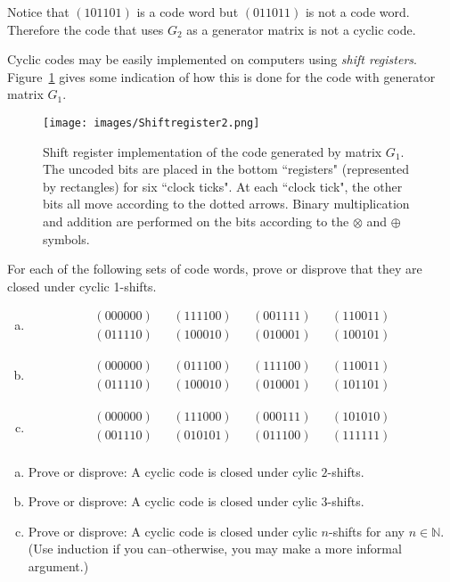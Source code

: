Notice that $(101101)$ is a code word but $(011011)$ is not a code word.  Therefore the code that uses $G_2$ as a generator matrix is not a cyclic code.

Cyclic codes may be easily implemented on computers using \emph{shift registers}. Figure~\ref{fig:shift} gives some indication of how this is done for the code with generator matrix $G_1$.
\begin{figure}[h]
\begin{center}
\texttt{[image: images/Shiftregister2.png]}
\end{center}
\caption{\label{fig:shift}Shift register implementation of the code generated by matrix $G_1$. The uncoded bits are placed in the bottom ``registers" (represented by rectangles) for six ``clock ticks". At each ``clock tick", the other bits all move according to the dotted arrows. Binary multiplication and addition are performed on the bits according to the $\otimes$ and $\oplus$ symbols. }
\end{figure}

\begin{exercise}\label{exercise:polycodes:proofofcyclic}
For each of the following sets of code words, prove or disprove that they are closed under cyclic 1-shifts.  
\begin{enumerate}[(a)]
\item
\[\begin{array}{ccccccc}
(000000) & & (111100) & & (001111) & & (110011)\\
(011110) & & (100010) & & (010001) & & (100101)
\end{array}\]
\item
\[\begin{array}{ccccccc}
(000000) & & (011100) & & (111100) & & (110011) \\
(011110) & & (100010) & & (010001) & & (101101)
\end{array}\]
\item
\[\begin{array}{ccccccc}
(000000) & & (111000) & & (000111) & & (101010) \\
(001110) & & (010101) & &(011100) & & (111111) \\
\end{array}\]
\end{enumerate}
\end{exercise}

\begin{exercise} {}
\begin{enumerate}[(a)]
\item
Prove or disprove: A cyclic code is closed under cylic $2$-shifts.
\item
Prove or disprove: A cyclic code is closed under cylic $3$-shifts.
\item
Prove or disprove: A cyclic code is closed under cylic $n$-shifts for any $n \in \mathbb{N}$. (Use induction if you can--otherwise, you may make a more informal argument.)
\end{enumerate}
\end{exercise}

